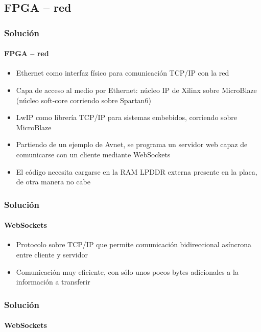 \documentclass[compress]{beamer}
\begin{document}
	\subsection{FPGA -- red}
		\begin{frame}
			\frametitle{Soluci\'on}
			\framesubtitle{FPGA -- red}
				\begin{itemize}
					\item
					{

						Ethernet como interfaz f\'isico para comunicaci\'on TCP/IP con la red

					}
					\item
					{

						Capa de acceso al medio por Ethernet: n\'ucleo IP de Xilinx sobre MicroBlaze (n\'ucleo soft-core corriendo sobre Spartan6)

					}
					\item
					{

						LwIP como librer\'ia TCP/IP para sistemas embebidos, corriendo sobre MicroBlaze

					}
					\item
					{

						Partiendo de un ejemplo de Avnet, se programa un servidor web capaz de comunicarse con un cliente mediante WebSockets

					}
					\item
					{

						El c\'odigo necesita cargarse en la RAM LPDDR externa presente en la placa, de otra manera no cabe

					}
				\end{itemize}

 		\end{frame}

		\begin{frame}
			\frametitle{Soluci\'on}
			\framesubtitle{WebSockets}
				\begin{itemize}
					\item
					{

						Protocolo sobre TCP/IP que permite comunicaci\'on bidireccional as\'incrona entre cliente y servidor

					}
					\item
					{

						Comunicaci\'on muy eficiente, con s\'olo unos pocos bytes adicionales a la informaci\'on a transferir

					}
				\end{itemize}
				\begin{figure}
				\end{figure}
 		\end{frame}
		\begin{frame}
			\frametitle{Soluci\'on}
			\framesubtitle{WebSockets}
				\begin{figure}
				\end{figure}
 		\end{frame}
\end{document}

